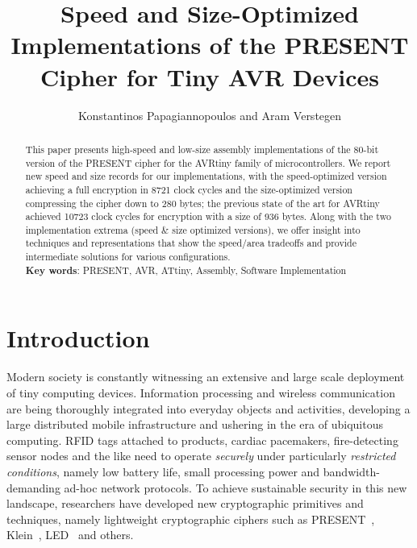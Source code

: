 \documentclass[11pt]{llncs2e} %
\begin{document}
\title{Speed and Size-Optimized Implementations of the PRESENT Cipher for Tiny AVR Devices}

\author{Konstantinos Papagiannopoulos and Aram Verstegen}
\maketitle

\begin{abstract}
This paper presents high-speed and low-size assembly implementations of the 80-bit version of the PRESENT cipher for the AVRtiny family of microcontrollers. We report new speed and size records for our implementations, with the speed-optimized version achieving a full encryption in 8721 clock cycles and the size-optimized version compressing the cipher down to 280 bytes; the previous state of the art for AVRtiny achieved 10723 clock cycles for encryption with a size of 936 bytes. Along with the two implementation extrema (speed \& size optimized versions), we offer insight into techniques and representations that show the speed/area tradeoffs and provide intermediate solutions for various configurations.\\
\textbf{Key words}: PRESENT, AVR, ATtiny, Assembly, Software Implementation
\end{abstract}
\section{Introduction}
Modern society is constantly witnessing an extensive and large scale deployment of tiny computing devices. Information processing and wireless communication are being thoroughly integrated into everyday objects and activities, developing a large distributed mobile infrastructure and ushering in the era of ubiquitous computing. RFID tags attached to products, cardiac pacemakers, fire-detecting sensor nodes and the like need to operate \emph{securely} under particularly \emph{restricted conditions}, namely low battery life, small processing power and bandwidth-demanding ad-hoc network protocols. To achieve sustainable security in this new landscape, researchers have developed new cryptographic primitives and techniques, namely lightweight cryptographic ciphers such as PRESENT~\cite{bogdanov2007present}, Klein~\cite{gong2012klein}, LED~\cite{guo2011led} and others.
\end{document}
